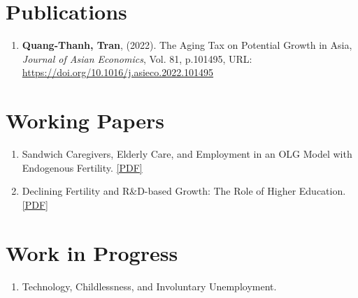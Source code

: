 \section{\sc Publications}
\begin{enumerate}
\item
  {\bf Quang-Thanh, Tran},
  (2022).
  {The Aging Tax on Potential Growth in Asia},
  {\it Journal of Asian Economics}, Vol. 81, p.101495,
  {URL: \url{https://doi.org/10.1016/j.asieco.2022.101495}}
\end{enumerate}

\section{\sc Working Papers}
\begin{enumerate}
  \item Sandwich Caregivers, Elderly Care, and Employment in an OLG Model with Endogenous Fertility. \href{https://www.dropbox.com/scl/fi/xr9qr05jw0df2fhd4kzsd/QTTran_Elderly.pdf?rlkey=vte4fo80110uaaqci1b3pxlgz&st=lcptweom&dl=0}{[PDF]}
  \item Declining Fertility and R\&D-based Growth: The Role of Higher Education. \href{https://www.dropbox.com/scl/fi/51b1sug5wckaqk639zyj7/QTTran_DeclineFertility_RD.pdf?rlkey=z3oi7rjrfy5mgm96hc98mkjw5&st=ql5ewejf&dl=0}{[PDF]}
\end{enumerate}

\section{\sc Work in Progress}
\begin{enumerate}
  \item Technology, Childlessness, and Involuntary Unemployment.
\end{enumerate}


